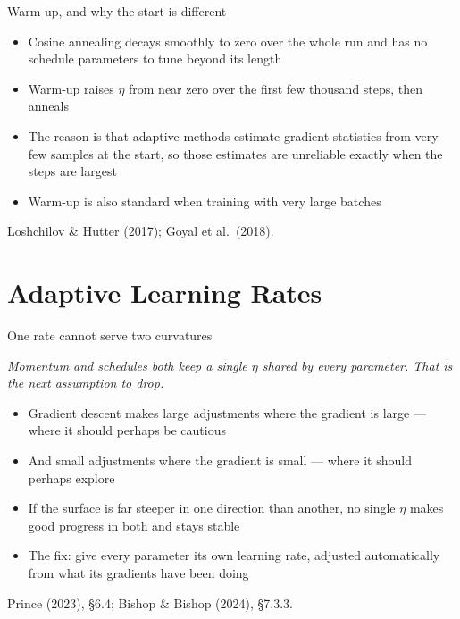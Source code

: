 \documentclass[aspectratio=169, 11pt]{beamer}
\newcommand{\bridge}[1]{%
  {\scriptsize\itshape\color{mcMuted} #1\par}\vspace{0.35em}}
\newcommand{\srcline}[1]{%
  \par\vspace{0.25em}%
  {\scriptsize\color{mcMuted}\hfill #1\par}}
\newcommand{\src}[3]{}      %
\begin{document}
\begin{frame}{Warm-up, and why the start is different}
  \src{prince2023}{page}{93}
  \src{goyal2018}{section}{2.2}
  \src{loshchilov2017}{equation}{5}
  \src{loshchilov2017}{section}{3}
  \vspace{0.3em}
  \begin{itemize}\itemsep0.45em
    \item Cosine annealing decays smoothly to zero over the whole run
          and has no schedule parameters to tune beyond its length
    \item \alert{Warm-up} raises $\eta$ from near zero over the first
          few thousand steps, then anneals
    \item The reason is that adaptive methods estimate gradient
          statistics from very few samples at the start, so those
          estimates are unreliable exactly when the steps are largest
    \item Warm-up is also standard when training with very large batches
  \end{itemize}
  \srcline{Loshchilov \& Hutter (2017); Goyal et al.~(2018).}
\end{frame}

\section{Adaptive Learning Rates}

\begin{frame}{One rate cannot serve two curvatures}
  \src{prince2023}{section}{6.4}
  \src{bishop2024}{section}{7.3.3}
  \bridge{Momentum and schedules both keep a single $\eta$ shared by
  every parameter. That is the next assumption to drop.}
  \vspace{0.4em}
  \begin{itemize}\itemsep0.45em
    \item Gradient descent makes \alert{large} adjustments where the
          gradient is large --- where it should perhaps be cautious
    \item And \alert{small} adjustments where the gradient is small ---
          where it should perhaps explore
    \item If the surface is far steeper in one direction than another,
          no single $\eta$ makes good progress in both and stays stable
    \item The fix: give every parameter its own learning rate, adjusted
          automatically from what its gradients have been doing
  \end{itemize}
  \srcline{Prince (2023), \S6.4; Bishop \& Bishop (2024), \S7.3.3.}
\end{frame}
\end{document}

